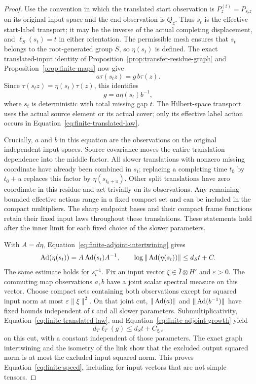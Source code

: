 \begin{proof}
Use the convention in which the translated start observation is
$P_z^{(t)}=P_{s_tz}$ on its original input space and the end observation
is $Q_z$.  Thus $s_t$ is the effective start-label transport; it may be
the inverse of the actual completing displacement, and
$\ell_S(s_t)=t$ in either orientation.
The permissible mesh ensures that $s_t$ belongs to the
root-generated group $S$, so $\eta(s_t)$ is defined.
The exact translated-input identity of
Proposition~\ref{prop:transfer-residue-graph} and
Proposition~\ref{prop:finite-maps} now give
\[
 a\tau(s_tz)=g\,b\tau(z).
\]
Since $\tau(s_tz)=\eta(s_t)\tau(z)$, this identifies
\begin{equation}
 g=a\eta(s_t)b^{-1},
 \label{eq:finite-translated-law}
\end{equation}
where $s_t$ is deterministic with total missing gap $t$.
The Hilbert-space transport uses the actual source element or
its actual cover; only its effective label action occurs in
Equation~\eqref{eq:finite-translated-law}.

Crucially, $a$ and $b$ in this equation are the observations on
the original independent input spaces.  Source covariance moves
the entire translation dependence into the middle factor.
All slower translations with nonzero missing coordinate have
already been combined in $s_t$; replacing a completing time
$t_0$ by $t_0+u$ replaces this factor by $\eta(s_{t_0+u})$.
Other split translations have zero coordinate in this residue
and act trivially on its observations.  Any remaining bounded
effective actions range in a fixed compact set and can be
included in the compact multipliers.  The sharp endpoint bases
and their compact frame functions retain their fixed input laws
throughout these translations.  These statements hold after
the inner limit for each fixed choice of the slower parameters.

With $A=d\eta$, Equation~\eqref{eq:finite-adjoint-intertwining}
gives
\[
 \operatorname{Ad}(\eta(s_t))=A\operatorname{Ad}(s_t)A^{-1},\qquad
 \log\|\operatorname{Ad}(\eta(s_t))\|\leq d_St+C.
\]
The same estimate holds for $s_t^{-1}$.
Fix an input vector $\xi\in\overline I\otimes H'$ and
$\varepsilon>0$.  The commuting map observations $a,b$ have
a joint scalar spectral measure on this vector.
Choose compact sets containing both observations except for
squared input norm at most $\varepsilon\|\xi\|^2$.
On that joint cut, $\|\operatorname{Ad}(a)\|$ and $\|\operatorname{Ad}(b^{-1})\|$ have
fixed bounds independent of $t$ and all slower parameters.
Submultiplicativity, Equation~\eqref{eq:finite-translated-law},
and Equation~\eqref{eq:finite-adjoint-growth} yield
\[
 d_T\ell_T(g)\leq d_St+C_{\xi,\varepsilon}
\]
on this cut, with a constant independent of those parameters.
The exact graph intertwining and the isometry of the link show
that the excluded output squared norm is at most the excluded
input squared norm.  This proves
Equation~\eqref{eq:finite-speed}, including for input vectors
that are not simple tensors.


\end{proof}
